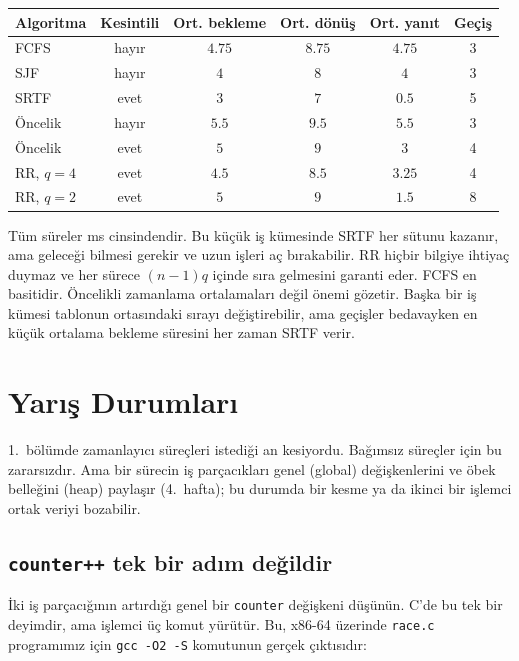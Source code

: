 \documentclass[11pt,a4paper]{article}
\newcommand{\cmd}[1]{\texttt{#1}}
\begin{document}
\begin{center}
\renewcommand{\arraystretch}{1.2}
\begin{tabular}{@{}lccccc@{}}
\toprule
\textbf{Algoritma} & \textbf{Kesintili} & \textbf{Ort. bekleme} & \textbf{Ort. dönüş} & \textbf{Ort. yanıt} & \textbf{Geçiş}\\
\midrule
FCFS & hayır & $4.75$ & $8.75$ & $4.75$ & 3\\
SJF & hayır & $4$ & $8$ & $4$ & 3\\
SRTF & evet & $3$ & $7$ & $0.5$ & 5\\
Öncelik & hayır & $5.5$ & $9.5$ & $5.5$ & 3\\
Öncelik & evet & $5$ & $9$ & $3$ & 4\\
RR, $q = 4$ & evet & $4.5$ & $8.5$ & $3.25$ & 4\\
RR, $q = 2$ & evet & $5$ & $9$ & $1.5$ & 8\\
\bottomrule
\end{tabular}
\end{center}

Tüm süreler ms cinsindendir. Bu küçük iş kümesinde SRTF her sütunu kazanır, ama geleceği bilmesi gerekir ve uzun işleri aç bırakabilir. RR hiçbir bilgiye ihtiyaç duymaz ve her sürece $(n-1)q$ içinde sıra gelmesini garanti eder. FCFS en basitidir. Öncelikli zamanlama ortalamaları değil önemi gözetir. Başka bir iş kümesi tablonun ortasındaki sırayı değiştirebilir, ama geçişler bedavayken en küçük ortalama bekleme süresini her zaman SRTF verir.

\section{Yarış Durumları}

1.~bölümde zamanlayıcı süreçleri istediği an kesiyordu. Bağımsız süreçler için bu zararsızdır. Ama bir sürecin iş parçacıkları genel (global) değişkenlerini ve öbek belleğini (heap) paylaşır (4.~hafta); bu durumda bir kesme ya da ikinci bir işlemci ortak veriyi bozabilir.

\subsection{\texttt{counter++} tek bir adım değildir}

İki iş parçacığının artırdığı genel bir \texttt{counter} değişkeni düşünün. C'de bu tek bir deyimdir, ama işlemci üç komut yürütür. Bu, x86-64 üzerinde \texttt{race.c} programımız için \cmd{gcc -O2 -S} komutunun gerçek çıktısıdır:
\end{document}
